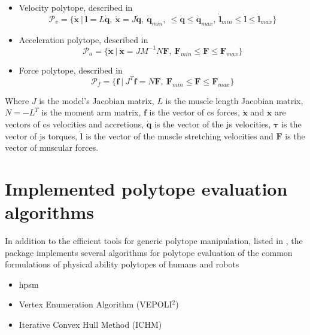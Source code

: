 \begin{itemize}
\itemindent=-13pt
\item Velocity polytope, described in 
\begin{equation}\label{eq:pv_h}
\mathcal{P}_{v} = \{\dot{\bm{x}} ~|~\dot{\bm{l}} = L\dot{\bm{q}},~ \dot{\bm{x}} = J\dot{\bm{q}},~ \dot{\bm{q}}_{min}, ~ \leq\dot{\bm{q}}\leq\dot{\bm{q}}_{max}, ~\dot{\bm{l}}_{min}\leq\dot{\bm{l}}\leq\dot{\bm{l}}_{max} \}
\end{equation}

\item Acceleration polytope, described in   
\begin{equation}\label{eq:pa_h}
\mathcal{P}_{a} = \{\ddot{\bm{x}} ~|~ \ddot{\bm{x}} = JM^{-1}N\bm{F},~ \bm{F}_{min}\leq \bm{F}\leq \bm{F}_{max} \}
\end{equation}

\item Force polytope, described in   
\begin{equation}\label{eq:pf_h}
\mathcal{P}_{f} = \{\bm{f} ~|~ J^T\bm{f} =N\bm{F},~ \bm{F}_{min}\leq \bm{F}\leq \bm{F}_{max} \}
\end{equation}
\end{itemize}

Where $J$ is the model's Jacobian matrix, $L$ is the muscle length Jacobian matrix, $N= -L^T$ is the moment arm matrix, $\bm{f}$ is the vector of \gls{cs} forces, $\dot{\bm{x}}$ and $\ddot{\bm{x}}$ are vectors of \gls{cs} velocities and accretions, $\dot{\bm{q}}$ is the vector of the \gls{js} velocities, $\bm{\tau}$ is the vector of \gls{js} torques, $\dot{\bm{l}}$ is the vector of the muscle stretching velocities and $\bm{F}$ is the vector of muscular forces. 

\section{Implemented polytope evaluation algorithms}
\label{sec:pycapacity_algos}

In addition to the efficient tools for generic polytope manipulation, listed in , the package implements several algorithms for polytope evaluation of the common formulations of physical ability polytopes of humans and robots

\begin{itemize}
    \item \gls{hpsm}
    \item Vertex Enumeration Algorithm (VEPOLI$^2$)
    \item Iterative Convex Hull Method (ICHM)
\end{itemize}

